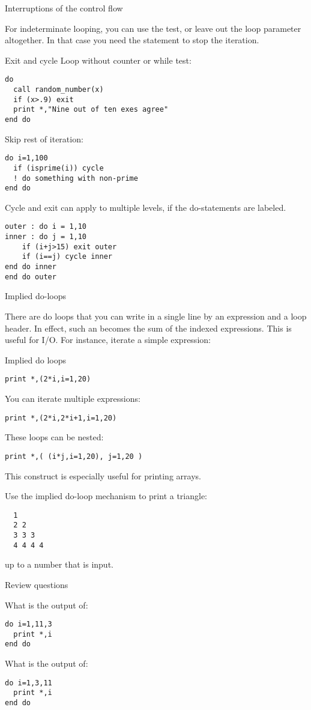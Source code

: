  {Interruptions of the control flow}

For indeterminate looping, you can use the  test,
or leave out the loop parameter altogether.
In that case you need the  statement to stop the iteration.

\begin{block}{Exit and cycle}
  \label{sl:loopexit}
  Loop without counter or while test:
\begin{lstlisting}
do
  call random_number(x)
  if (x>.9) exit
  print *,"Nine out of ten exes agree"
end do
\end{lstlisting}

Skip rest of iteration:
\begin{lstlisting}
do i=1,100
  if (isprime(i)) cycle
  ! do something with non-prime
end do
\end{lstlisting}
\end{block}

Cycle and exit can apply to multiple levels, if the do-statements are
labeled.

\begin{lstlisting}
outer : do i = 1,10
inner : do j = 1,10
    if (i+j>15) exit outer
    if (i==j) cycle inner
end do inner
end do outer
\end{lstlisting}

 {Implied do-loops}
\label{sec:f-impdo}

There are do loops that you can write in a single line by an
expression and a loop header. In effect, such an
 becomes the sum of the indexed
expressions. This is useful
for I/O. For instance, iterate a simple expression:

\begin{block}{Implied do loops}
  \label{sl:implieddo}
\begin{lstlisting}
print *,(2*i,i=1,20)
\end{lstlisting}
You can iterate multiple expressions:
\begin{lstlisting}
print *,(2*i,2*i+1,i=1,20)
\end{lstlisting}
These loops can be nested:
\begin{lstlisting}
print *,( (i*j,i=1,20), j=1,20 )
\end{lstlisting}
\end{block}

This construct is especially useful for printing arrays.

\begin{exercise}
  \label{ex:impl-triangle}
  Use the implied do-loop mechanism to print a triangle:
\begin{lstlisting}
  1
  2 2
  3 3 3
  4 4 4 4
\end{lstlisting}
  up to a number that is input.
\end{exercise}

 {Review questions}

\begin{exercise}
  \label{ex:floop-inf}
  What is the output of:
\begin{lstlisting}
do i=1,11,3
  print *,i
end do
\end{lstlisting}
What is the output of:
\begin{lstlisting}
do i=1,3,11
  print *,i
end do
\end{lstlisting}
\end{exercise}

